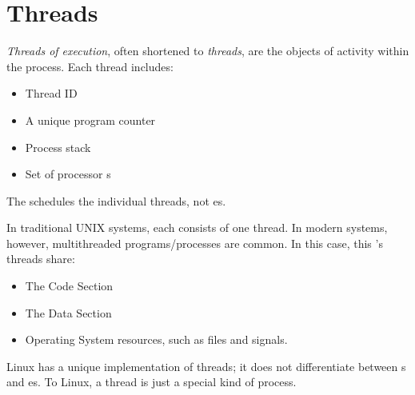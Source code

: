 \section{Threads}\label{sec:Threads}
\begin{definition}[Thread]\label{def:Thread}
  \emph{Threads of execution}, often shortened to \emph{threads}, are the objects of activity within the process.
  Each thread includes:
  \begin{itemize}[noitemsep]
  \item Thread ID
  \item A unique program counter
  \item Process stack
  \item Set of processor s
  \end{itemize}

  The  schedules the individual threads, not es.

  In traditional UNIX systems, each  consists of one thread.
  In modern systems, however, multithreaded programs/processes are common.
  In this case, this 's threads share:
  \begin{itemize}[noitemsep]
  \item The Code Section
  \item The Data Section
  \item Operating System resources, such as files and signals.
  \end{itemize}

  \begin{remark}\label{rmk:Linux_Threads}
    Linux has a unique implementation of threads; it does not differentiate between s and es.
    To Linux, a thread is just a special kind of process.
  \end{remark}
\end{definition}


